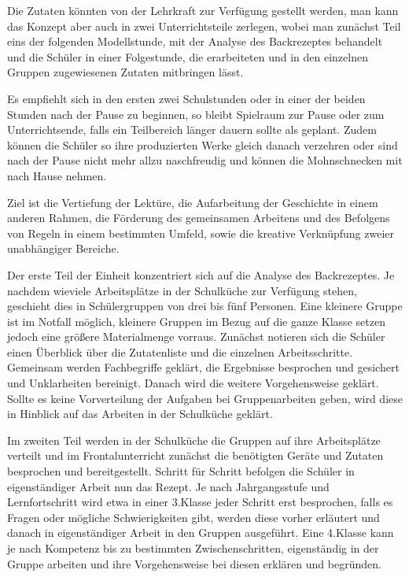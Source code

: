 {Die Zutaten könnten von der Lehrkraft zur Verfügung gestellt werden, man kann das Konzept aber auch in zwei Unterrichtsteile zerlegen, wobei man zunächst Teil eins der folgenden Modellstunde, mit der Analyse des Backrezeptes behandelt und die Schüler in einer Folgestunde, die erarbeiteten und in den einzelnen Gruppen zugewiesenen Zutaten mitbringen lässt.

Es empfiehlt sich in den ersten zwei Schulstunden oder in einer der beiden Stunden nach der Pause zu beginnen, so bleibt Spielraum zur Pause oder zum Unterrichtsende, falls ein Teilbereich länger dauern sollte als geplant. Zudem können die Schüler so ihre produzierten Werke gleich danach verzehren oder sind nach der Pause nicht mehr allzu naschfreudig und können die Mohnschnecken mit nach Hause nehmen.

Ziel ist die Vertiefung der Lektüre, die Aufarbeitung der Geschichte in einem anderen Rahmen, die Förderung des gemeinsamen Arbeitens und des Befolgens von Regeln in einem bestimmten Umfeld, sowie die kreative Verknüpfung zweier unabhängiger Bereiche.

Der erste Teil der Einheit konzentriert sich auf die Analyse des Backrezeptes. Je nachdem wieviele Arbeitsplätze in der Schulküche zur Verfügung stehen, geschieht dies in Schülergruppen von drei bis fünf Personen. Eine kleinere Gruppe ist im Notfall möglich, kleinere Gruppen im Bezug auf die ganze Klasse setzen jedoch eine größere Materialmenge vorraus. Zunächst notieren sich die Schüler einen Überblick über die Zutatenliste und die einzelnen Arbeitsschritte. Gemeinsam werden Fachbegriffe geklärt, die Ergebnisse besprochen und gesichert und Unklarheiten bereinigt. Danach wird die weitere Vorgehensweise geklärt. Sollte es keine Vorverteilung der Aufgaben bei Gruppenarbeiten geben, wird diese in Hinblick auf das Arbeiten in der Schulküche geklärt.

Im zweiten Teil werden in der Schulküche die Gruppen auf ihre Arbeitsplätze verteilt und im Frontalunterricht zunächst die benötigten Geräte und Zutaten besprochen und bereitgestellt. Schritt für Schritt befolgen die Schüler in eigenständiger Arbeit nun das Rezept. Je nach Jahrgangsstufe und Lernfortschritt wird etwa in einer 3.Klasse  jeder Schritt erst besprochen, falls es Fragen oder mögliche Schwierigkeiten gibt, werden diese vorher erläutert und danach in eigenständiger Arbeit in den Gruppen ausgeführt. Eine 4.Klasse kann je nach Kompetenz bis zu bestimmten Zwischenschritten, eigenständig in der Gruppe arbeiten und ihre Vorgehensweise bei diesen erklären und begründen.

}
